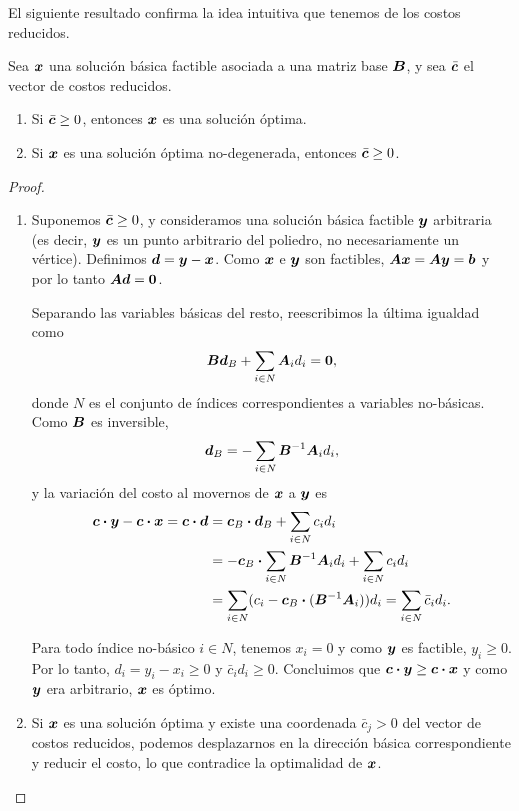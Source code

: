 El siguiente resultado confirma la idea intuitiva que tenemos de los costos reducidos.

\begin{theorem}
Sea $\bm{x}$ una solución básica factible asociada a una matriz base $\bm{B}$, y sea $\bar {\bm{c}}$ el vector de costos reducidos.
\begin{enumerate}
\item Si $\bar {\bm{c}} \ge 0$, entonces $\bm{x}$ es una solución óptima.
\item Si $\bm{x}$ es una solución óptima no-degenerada, entonces $\bar {\bm{c}} \ge 0$.
\end{enumerate}
\end{theorem}

\begin{proof}\leavevmode
\begin{enumerate}
\item Suponemos $\bar {\bm{c}} \ge 0$, y consideramos una solución básica factible $\bm{y}$ arbitraria (es decir, $\bm{y}$ es un punto arbitrario del poliedro, no necesariamente un vértice). Definimos $\bm{d} = \bm{y} - \bm{x}$. Como $\bm{x}$ e $\bm{y}$ son factibles, $\bm{A} \bm{x} = \bm{A} \bm{y} = \bm{b}$ y por lo tanto $\bm{A} \bm{d} = \bm{0}$.

Separando las variables básicas del resto, reescribimos la última igualdad como
$$
\bm{B} \bm{d}_B + \sum_{i \in N} \bm{A}_i d_i = \bm{0},
$$
donde $N$ es el conjunto de índices correspondientes a variables no-básicas. Como $\bm{B}$ es inversible,
$$
\bm{d}_B = -\sum_{i \in N} \bm{B}^{-1} \bm{A}_i d_i,
$$
y la variación del costo al movernos de $\bm{x}$ a $\bm{y}$ es
\begin{align*}
\bm{c} \boldsymbol{\cdot} \bm{y} - \bm{c} \boldsymbol{\cdot} \bm{x} = \bm{c} \boldsymbol{\cdot} \bm{d} &= \bm{c}_B \boldsymbol{\cdot} \bm{d}_B + \sum_{i \in N} c_i d_i \\
&= -\bm{c}_B \boldsymbol{\cdot} \sum_{i \in N} \bm{B}^{-1} \bm{A}_i d_i + \sum_{i \in N} c_i d_i \\
&= \sum_{i \in N} (c_i - \bm{c}_B \boldsymbol{\cdot} (\bm{B}^{-1} \bm{A}_i)) d_i = \sum_{i \in N} \bar c_i d_i.
\end{align*}


Para todo índice no-básico $i \in N$, tenemos $x_i = 0$ y como $\bm{y}$ es factible, $y_i \ge 0$. Por lo tanto, $d_i = y_i - x_i \ge 0$ y $\bar c_i d_i \ge 0$. Concluimos que $\bm{c} \boldsymbol{\cdot} \bm{y} \ge \bm{c} \boldsymbol{\cdot} \bm{x}$ y como $\bm{y}$ era arbitrario, $\bm{x}$ es óptimo.

\item Si $\bm{x}$ es una solución óptima y existe una coordenada $\bar c_j > 0$ del vector de costos reducidos, podemos desplazarnos en la dirección básica correspondiente y reducir el costo, lo que contradice la optimalidad de $\bm{x}$.
\end{enumerate}
\end{proof}

